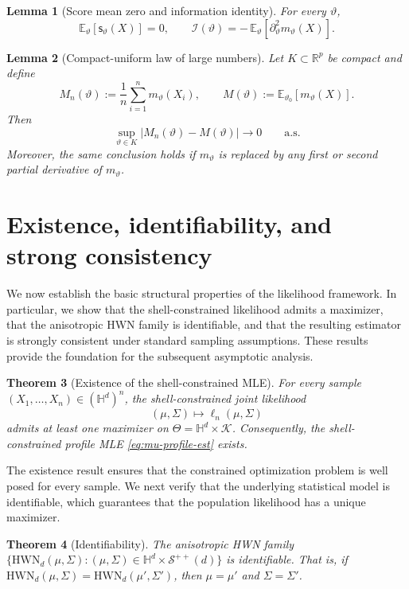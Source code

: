 \documentclass[11pt]{article}
\newtheorem{theorem}{Theorem}[section]
\newtheorem{lemma}[theorem]{Lemma}
\newcommand{\R}{\mathbb{R}}
\newcommand{\E}{\mathbb{E}}
\newcommand{\Hh}{\mathbb{H}}
\newcommand{\SPD}{\mathcal{S}^{++}}
\newcommand{\shell}{\mathcal{K}}
\newcommand{\score}{\mathsf{s}}
\newcommand{\info}{\mathcal{I}}
\begin{document}
\begin{lemma}[Score mean zero and information identity]
\label{lem:scoremean}
For every $\vartheta$,
\[
\E_\vartheta[\score_\vartheta(X)]=0,
\qquad
\info(\vartheta)= -\,\E_\vartheta[\partial_\vartheta^2 m_\vartheta(X)].
\]
\end{lemma}




\begin{lemma}[Compact-uniform law of large numbers]
\label{lem:ulln}
Let $K\subset\R^p$ be compact and define
\[
M_n(\vartheta):=\frac1n\sum_{i=1}^n m_\vartheta(X_i),
\qquad
M(\vartheta):=\E_{\vartheta_0}[m_\vartheta(X)].
\]
Then
\[
\sup_{\vartheta\in K}\bigl|M_n(\vartheta)-M(\vartheta)\bigr|\to 0
\qquad\text{a.s.}
\]
Moreover, the same conclusion holds if $m_\vartheta$ is replaced by any first or second partial derivative of $m_\vartheta$.
\end{lemma}






\section{Existence, identifiability, and strong consistency}\label{sec:existence_consistency}

We now establish the basic structural properties of the likelihood framework. In particular, we show that the shell-constrained likelihood admits a maximizer, that the anisotropic HWN family is identifiable, and that the resulting estimator is strongly consistent under standard sampling assumptions. These results provide the foundation for the subsequent asymptotic analysis.

\begin{theorem}[Existence of the shell-constrained MLE]
\label{thm:existence}
For every sample $(X_1,\dots,X_n)\in(\Hh^d)^n$, the shell-constrained joint likelihood
\[
(\mu,\Sigma)\mapsto \ell_n(\mu,\Sigma)
\]
admits at least one maximizer on $\Theta=\Hh^d\times\shell$. Consequently, the shell-constrained profile MLE \eqref{eq:mu-profile-est} exists.
\end{theorem}

The existence result ensures that the constrained optimization problem is well posed for every sample. We next verify that the underlying statistical model is identifiable, which guarantees that the population likelihood has a unique maximizer.

\begin{theorem}[Identifiability]
\label{thm:identifiability}
The anisotropic HWN family $\{\mathrm{HWN}_d(\mu,\Sigma):(\mu,\Sigma)\in \Hh^d\times \SPD(d)\}$ is identifiable. That is, if
$\mathrm{HWN}_d(\mu,\Sigma)=\mathrm{HWN}_d(\mu',\Sigma')$, then $\mu=\mu'$ and $\Sigma=\Sigma'$.
\end{theorem}
\end{document}
